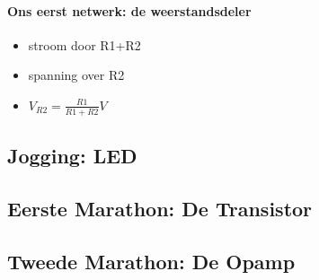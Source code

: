 \documentclass[11pt]{article}
\begin{document}
\paragraph*{Ons eerst netwerk: de weerstandsdeler}

\begin{itemize}
	\item stroom door R1+R2
	\item spanning over R2
	\item $V_{R2} = \frac{R1}{R1+R2}V$
\end{itemize}
\subsection{Jogging: LED}
\subsection{Eerste Marathon: De Transistor}
\subsection{Tweede Marathon: De Opamp}
\end{document}
